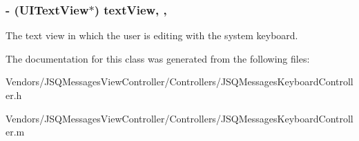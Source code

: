 \subsubsection[{text\+View}]{\setlength{\rightskip}{0pt plus 5cm}-\/ (U\+I\+Text\+View$\ast$) text\+View\hspace{0.3cm}{\ttfamily [read]}, {\ttfamily [nonatomic]}, {\ttfamily [weak]}}\label{interface_j_s_q_messages_keyboard_controller_a4053b7b2aafa792d2cceba5e3ccdf56d}
The text view in which the user is editing with the system keyboard. 

The documentation for this class was generated from the following files\+:\begin{DoxyCompactItemize}
\item 
Vendors/\+J\+S\+Q\+Messages\+View\+Controller/\+Controllers/J\+S\+Q\+Messages\+Keyboard\+Controller.\+h\item 
Vendors/\+J\+S\+Q\+Messages\+View\+Controller/\+Controllers/J\+S\+Q\+Messages\+Keyboard\+Controller.\+m\end{DoxyCompactItemize}
